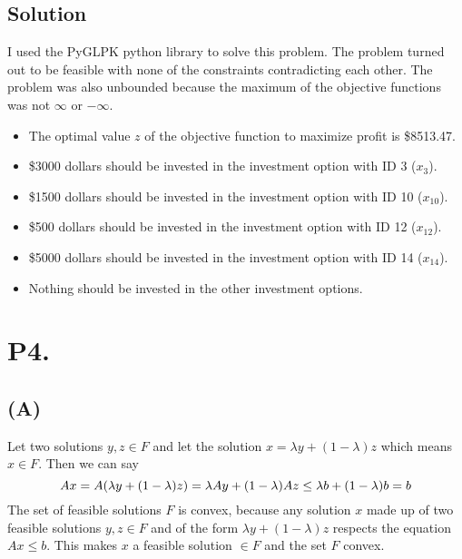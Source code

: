 \documentclass[12pt]{article}
\begin{document}
\subsection*{}

\subsection*{Solution}
I used the PyGLPK python library to solve this problem.  The problem turned out to be feasible with none of the constraints contradicting each other.  The problem was also unbounded because the maximum of the objective functions was not $\infty$ or $-\infty$.\\ 
\begin{itemize}
  \item The optimal value $z$ of the objective function to maximize profit is \$8513.47.
  \item \$3000 dollars should be invested in the investment option with ID 3 ($x_{3}$).
  \item \$1500 dollars should be invested in the investment option with ID 10 ($x_{10}$).
  \item \$500 dollars should be invested in the investment option with ID 12 ($x_{12}$).
  \item \$5000 dollars should be invested in the investment option with ID 14 ($x_{14}$).
  \item Nothing should be invested in the other investment options.
\end{itemize}
\newpage
\section*{P4.}
\subsection*{(A)}
Let two solutions $y, z \in F$ and let the solution $x = \lambda y + (1 - \lambda)z$ which means $x \in F$.  Then we can say
$$
Ax = A(\lambda y + (1 - \lambda)z) = \lambda Ay + (1 - \lambda)Az \leq \lambda b + (1 - \lambda)b = b\\
$$
The set of feasible solutions $F$ is convex, because any solution $x$ made up of two feasible solutions $y, z \in F$ and of the form $\lambda y + (1 - \lambda)z$ respects the equation $Ax \leq b$.  This makes $x$ a feasible solution $\in F$ and the set $F$ convex.
\end{document}
